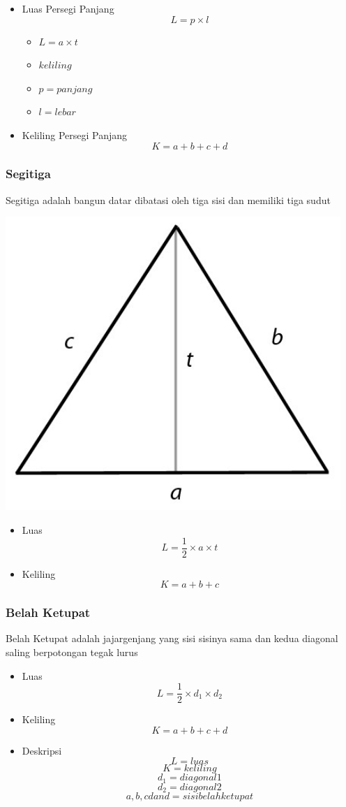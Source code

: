 \documentclass[12pt]{article}
\begin{document}
			
			\begin{itemize}
				\item Luas Persegi Panjang
				$$L=p \times l$$
				\begin{itemize}
				\item $L=a\times t$
				\item $keliling$
				\item $p=panjang$
				\item $l=lebar$
				\end{itemize}
				\item Keliling Persegi Panjang
				$$K=a+b+c+d$$
			\end{itemize}
			\subsubsection{Segitiga}
			Segitiga adalah bangun datar dibatasi oleh tiga sisi dan memiliki tiga sudut
			
			\begin{center}
			\includegraphics[width=5in]{luas-segitiga.jpg}
			\end{center}
			\begin{itemize}
			\item Luas
			$$L=\frac{1}{2} \times a \times t$$
			\item Keliling
			$$K=a+b+c$$
			\end{itemize}
			\subsubsection{Belah Ketupat}
			Belah Ketupat adalah jajargenjang yang sisi sisinya sama dan kedua diagonal saling berpotongan tegak lurus
			\begin{itemize}
			\item Luas
			$$L=\frac{1}{2} \times d_1 \times d_2 $$
			\item Keliling
			$$K=a+b+c+d$$
			\item Deskripsi
			$$L=luas$$
			$$K=keliling$$
			$$d_1=diagonal 1$$
			$$d_2=diagonal 2$$
			$$a,b,c dan d = sisi belah ketupat$$
			\end{itemize}
\end{document}
